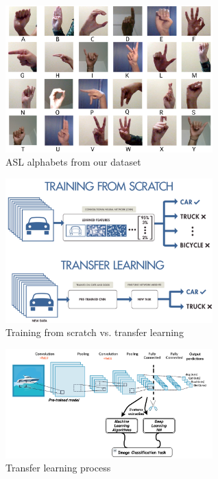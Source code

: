 \documentclass[twocolumn]{article}
\begin{document}
\begin{figure}[h]
\centering
\includegraphics[width=8cm]{./figures/alphabets}
\caption{ASL alphabets from our dataset}
\end{figure}

\begin{figure}[h]
\centering
\includegraphics[width=8cm]{./figures/training from scratch vs. transfer learning}
\caption{Training from scratch vs. transfer learning}
\end{figure}

\begin{figure}[h]
\centering
\includegraphics[width=8cm]{./figures/transfer learning process}
\caption{Transfer learning process}
\end{figure}
\end{document}
